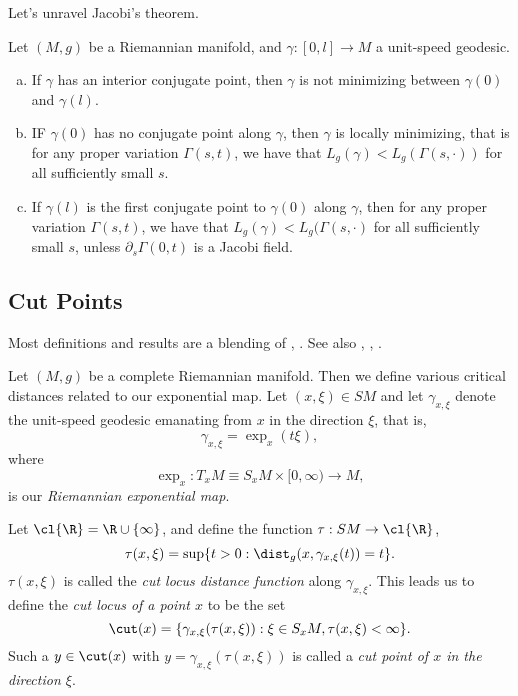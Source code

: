 Let's unravel Jacobi's theorem.

\begin{cor}
Let $(M,g)$ be a Riemannian manifold, and $\gamma:[0,l]\to M$ a unit-speed geodesic.
\begin{enumerate}[a.]
	\item If $\gamma$ has an interior conjugate point, then $\gamma$ is not minimizing between $\gamma(0)$ and $\gamma(l)$.
	\item IF $\gamma(0)$ has no conjugate point along $\gamma$, then $\gamma$ is locally minimizing, that is for any proper variation $\Gamma(s,t)$, we have that $L_g(\gamma)<L_g(\Gamma(s,\cdot))$ for all sufficiently small $s$.
	\item If $\gamma(l)$ is the first conjugate point to $\gamma(0)$ along $\gamma$, then for any proper variation $\Gamma(s,t)$, we have that $L_g(\gamma)<L_g(\Gamma(s,\cdot)$ for all sufficiently small $s$, unless $\partial_s\Gamma(0,t)$ is a Jacobi field.
\end{enumerate}

    
\end{cor}





\subsection{Cut Points}

\begin{tcolorbox}
Most definitions and results are a blending of \cite{klingenberg1959contributions} \cite{klingenberg1995riemannian}, \cite{sakai1996riemannian}.	See also \cite{bishop1977decomposition}, \cite{weinstein1968cut}, \cite{wolter1979distance}.
\end{tcolorbox}


Let $(M,g)$ be a complete Riemannian manifold.  Then we define various critical distances related to our exponential map.  Let $(x,\xi)\in SM$ and let $\gamma_{x,\xi}$ denote the unit-speed geodesic emanating from $x$ in the direction $\xi$, that is,
$$\gamma_{x,\xi}=\exp_x(t\xi),$$
where
$$\exp_x:T_xM\equiv S_xM\times[0,\infty)\to M,$$
is our \textit{Riemannian exponential map}.

Let $\cl{\R}=\R\cup\{\infty\}$, and define the function $\tau:SM\to\cl{\R}$,
$$\tau(x,\xi)=\sup\{t>0:\dist_g(x,\gamma_{x,\xi}(t))=t\}.$$
$\tau(x,\xi)$ is called the \textit{cut locus distance function} along $\gamma_{x,\xi}$.  This leads us to define the \textit{cut locus of a point $x$} to be the set
$$\cut(x)=\{\gamma_{x,\xi}(\tau(x,\xi)):\xi\in S_xM, \tau(x,\xi)<\infty\}.$$
Such a $y\in\cut(x)$ with $y=\gamma_{x,\xi}(\tau(x,\xi))$ is called a \textit{cut point of $x$ in the direction $\xi$}.



